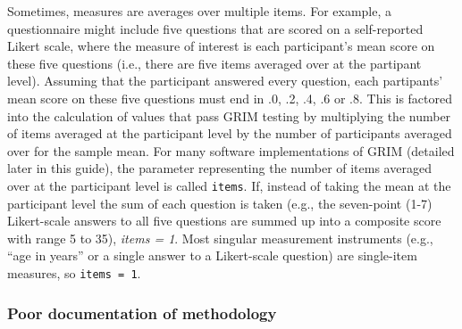 \documentclass[letterpaper, 12pt]{article}
\begin{document}
Sometimes, measures are averages over multiple items. For example, a questionnaire might include five questions that are scored on a self-reported Likert scale, where the measure of interest is each participant's mean score on these five questions (i.e., there are five items averaged over at the partipant level). Assuming that the participant answered every question, each partipants' mean score on these five questions must end in .0, .2, .4, .6 or .8. This is factored into the calculation of values that pass GRIM testing by multiplying the number of items averaged at the participant level by the number of participants averaged over for the sample mean. For many software implementations of GRIM (detailed later in this guide), the parameter representing the number of items averaged over at the participant level is called \texttt{items}. If, instead of taking the mean at the participant level the sum of each question is taken (e.g., the seven-point (1-7) Likert-scale answers to all five questions are summed up into a composite score with range 5 to 35), \textit{items = 1}. Most singular measurement instruments (e.g., ``age in years'' or a single answer to a Likert-scale question) are single-item measures, so \texttt{items = 1}.


\subsubsection*{Poor documentation of methodology}
\end{document}
